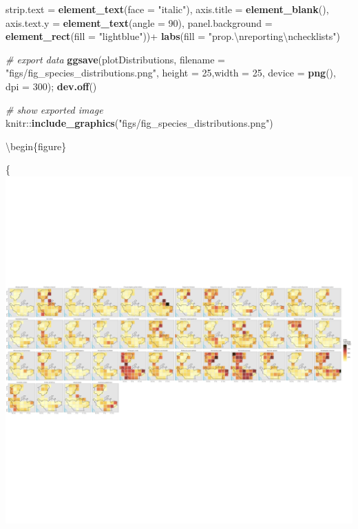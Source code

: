 \documentclass[]{article}
\newenvironment{Shaded}{}{}
\newcommand{\CharTok}[1]{\textcolor[rgb]{0.25,0.44,0.63}{#1}}
\newcommand{\CommentTok}[1]{\textcolor[rgb]{0.38,0.63,0.69}{\textit{#1}}}
\newcommand{\DataTypeTok}[1]{\textcolor[rgb]{0.56,0.13,0.00}{#1}}
\newcommand{\DecValTok}[1]{\textcolor[rgb]{0.25,0.63,0.44}{#1}}
\newcommand{\KeywordTok}[1]{\textcolor[rgb]{0.00,0.44,0.13}{\textbf{#1}}}
\newcommand{\NormalTok}[1]{#1}
\newcommand{\OperatorTok}[1]{\textcolor[rgb]{0.40,0.40,0.40}{#1}}
\newcommand{\StringTok}[1]{\textcolor[rgb]{0.25,0.44,0.63}{#1}}
\begin{document}
\begin{Shaded}
\begin{Highlighting}[]
        \DataTypeTok{strip.text =} \KeywordTok{element_text}\NormalTok{(}\DataTypeTok{face =} \StringTok{"italic"}\NormalTok{),}
        \DataTypeTok{axis.title =} \KeywordTok{element_blank}\NormalTok{(),}
        \DataTypeTok{axis.text.y =} \KeywordTok{element_text}\NormalTok{(}\DataTypeTok{angle =} \DecValTok{90}\NormalTok{),}
        \DataTypeTok{panel.background =} \KeywordTok{element_rect}\NormalTok{(}\DataTypeTok{fill =} \StringTok{"lightblue"}\NormalTok{))}\OperatorTok{+}
\StringTok{  }\KeywordTok{labs}\NormalTok{(}\DataTypeTok{fill =} \StringTok{"prop.}\CharTok{\textbackslash{}n}\StringTok{reporting}\CharTok{\textbackslash{}n}\StringTok{checklists"}\NormalTok{)}
  
\CommentTok{# export data}
\KeywordTok{ggsave}\NormalTok{(plotDistributions, }
       \DataTypeTok{filename =} \StringTok{"figs/fig_species_distributions.png"}\NormalTok{,}
       \DataTypeTok{height =} \DecValTok{25}\NormalTok{,}\DataTypeTok{width =} \DecValTok{25}\NormalTok{, }\DataTypeTok{device =} \KeywordTok{png}\NormalTok{(), }\DataTypeTok{dpi =} \DecValTok{300}\NormalTok{); }\KeywordTok{dev.off}\NormalTok{()}
\end{Highlighting}
\end{Shaded}

\begin{Shaded}
\begin{Highlighting}[]

\CommentTok{# show exported image}
\NormalTok{knitr}\OperatorTok{::}\KeywordTok{include_graphics}\NormalTok{(}\StringTok{"figs/fig_species_distributions.png"}\NormalTok{)}
\end{Highlighting}
\end{Shaded}

\textbackslash{}begin\{figure\}

\{\centering \includegraphics[width=\textwidth]{figs/fig_species_distributions}
\end{document}
